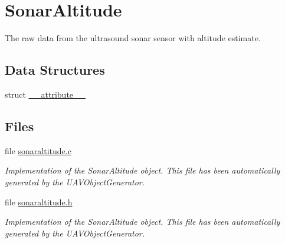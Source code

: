 \hypertarget{group___sonar_altitude}{\section{\-Sonar\-Altitude}
\label{group___sonar_altitude}
}


\-The raw data from the ultrasound sonar sensor with altitude estimate.  


\subsection*{\-Data \-Structures}
\begin{DoxyCompactItemize}
\item 
struct \hyperlink{struct____attribute____}{\-\_\-\-\_\-attribute\-\_\-\-\_\-}
\end{DoxyCompactItemize}
\subsection*{\-Files}
\begin{DoxyCompactItemize}
\item 
file \hyperlink{sonaraltitude_8c}{sonaraltitude.\-c}
\begin{DoxyCompactList}\small\item\em \-Implementation of the \-Sonar\-Altitude object. \-This file has been automatically generated by the \-U\-A\-V\-Object\-Generator. \end{DoxyCompactList}\item 
file \hyperlink{sonaraltitude_8h}{sonaraltitude.\-h}
\begin{DoxyCompactList}\small\item\em \-Implementation of the \-Sonar\-Altitude object. \-This file has been automatically generated by the \-U\-A\-V\-Object\-Generator. \end{DoxyCompactList}\end{DoxyCompactItemize}
